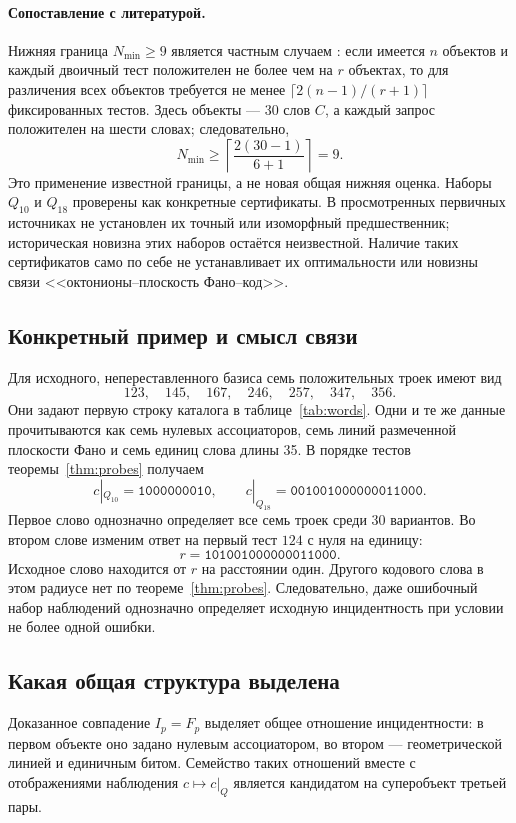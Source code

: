 \documentclass[11pt,a4paper]{article}
\numberwithin{equation}{section}
\theoremstyle{definition}
\theoremstyle{remark}
\begin{document}
\paragraph{Сопоставление с литературой.}
Нижняя граница $N_{\min}\ge9$ является частным случаем
\cite[Proposition~3]{crowston}: если имеется $n$ объектов и каждый
двоичный тест положителен не более чем на $r$ объектах, то для
различения всех объектов требуется не менее
$\lceil2(n-1)/(r+1)\rceil$ фиксированных тестов.
Здесь объекты --- 30 слов $C$, а каждый запрос положителен на шести
словах; следовательно,
\[
 N_{\min}\ge\left\lceil\frac{2(30-1)}{6+1}\right\rceil=9.
\]
Это применение известной границы, а не новая общая нижняя оценка.
Наборы $Q_{10}$ и $Q_{18}$ проверены как конкретные сертификаты.
В просмотренных первичных источниках не установлен их точный
или изоморфный предшественник; историческая новизна этих наборов
остаётся неизвестной. Наличие таких сертификатов само по себе
не устанавливает их оптимальности или новизны связи
<<октонионы--плоскость Фано--код>>.

\subsection{Конкретный пример и смысл связи}
Для исходного, непереставленного базиса семь положительных троек имеют вид
\[
 123,\quad145,\quad167,\quad246,\quad257,\quad347,\quad356.
\]
Они задают первую строку каталога в таблице~\ref{tab:words}.
Одни и те же данные прочитываются как семь нулевых ассоциаторов,
семь линий размеченной плоскости Фано и семь единиц слова длины 35.
В порядке тестов теоремы~\ref{thm:probes} получаем
\[
 c|_{Q_{10}}=\texttt{1000000010},\qquad
 c|_{Q_{18}}=\texttt{001001000000011000}.
\]
Первое слово однозначно определяет все семь троек среди 30 вариантов.
Во втором слове изменим ответ на первый тест $124$ с нуля на единицу:
\[
 r=\texttt{101001000000011000}.
\]
Исходное слово находится от $r$ на расстоянии один. Другого
кодового слова в этом радиусе нет по теореме~\ref{thm:probes}.
Следовательно, даже ошибочный набор наблюдений однозначно определяет
исходную инцидентность при условии не более одной ошибки.

\subsection{Какая общая структура выделена}
Доказанное совпадение $I_p=F_p$ выделяет общее отношение инцидентности:
в первом объекте оно задано нулевым ассоциатором, во втором ---
геометрической линией и единичным битом. Семейство таких отношений
вместе с отображениями наблюдения $c\mapsto c|_Q$ является
кандидатом на суперобъект третьей пары.
\end{document}
